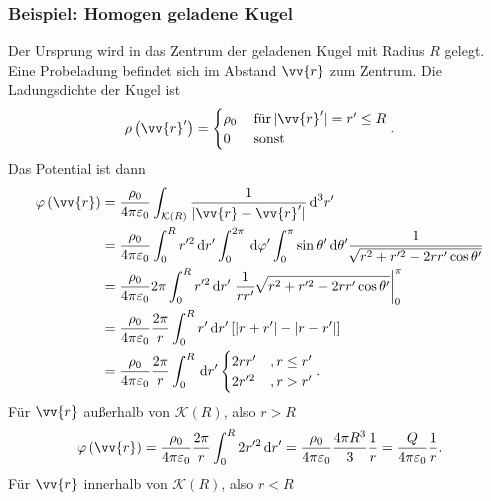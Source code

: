 \documentclass[a4paper,12pt]{article}
\newcommand{\td}{\,\text{d}}
\numberwithin{equation}{section}
\begin{document}
\subsubsection{Beispiel: Homogen geladene Kugel}
Der Ursprung wird in das Zentrum der geladenen Kugel mit Radius $R$ gelegt. Eine Probeladung befindet sich im Abstand $\vv{r}$ zum Zentrum. Die Ladungsdichte der Kugel ist
\begin{align} 
        \rho \left(\vv{r}'\right)=\begin{cases}
                \rho _0&\,\text{für}\,|\vv{r}'|=r'\leq R\\
                0&\,\text{sonst}\,
        \end{cases}
.\end{align} 
Das Potential ist dann
\begin{align} 
        \varphi \left(\vv{r}\right)&=\dfrac{\rho _0}{4\pi \varepsilon _0}\int_{\mathcal{K}\left(R\right)}^{}\dfrac{1}{|\vv{r}-\vv{r}'|}\td ^3r'\\
                                   &=\dfrac{\rho _0}{4\pi \varepsilon _0}\int_{0}^{R}r'^2\td r'\int_{0}^{2\pi }\td \varphi '\int_{0}^{\pi }\sin \theta '\td \theta '\dfrac{1}{\,\sqrt[]{r^2+r'^2-2rr'\cos \theta '}}\nonumber \\
                                   &=\dfrac{\rho _0}{4\pi \varepsilon _0}2\pi \int_{0}^{R}r'^2\td r'\left.\dfrac{1}{rr'}\,\sqrt[]{r^2+r'^2-2rr'\cos \theta '}\right|_0^\pi \nonumber \\
                                   &=\dfrac{\rho _0}{4\pi \varepsilon _0}\dfrac{2\pi }{r}\int_{0}^{R}r'\td r'\left[|r+r'|-|r-r'|\right]\nonumber \\
                                   &=\dfrac{\rho _0}{4\pi \varepsilon _0}\dfrac{2\pi }{r}\int_{0}^{R}\td r'\begin{cases}
                                           2rr'&,r\leq r'\\
                                           2r'^2&,r>r'
                                   \end{cases}
.\end{align} 
Für $\vv{r}$ außerhalb von $\mathcal{K}\left(R\right)$, also $r>R$ 
\begin{align} 
        \varphi \left(\vv{r}\right)=\dfrac{\rho _0}{4\pi \varepsilon _0}\dfrac{2\pi }{r}\int_{0}^{R}2r'^2\td r'=\dfrac{\rho _0}{4\pi \varepsilon _0}\dfrac{4\pi R^3}{3}\dfrac{1}{r}=\dfrac{Q}{4\pi \varepsilon _0}\dfrac{1}{r}
.\end{align} 
Für $\vv{r}$ innerhalb von $\mathcal{K}\left(R\right)$, also $r<R$ 
\end{document}
